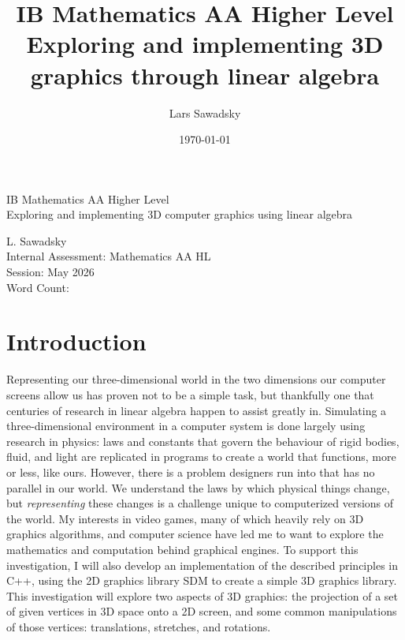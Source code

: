 \documentclass[12pt, a4paper]{article}
\title{ IB Mathematics AA Higher Level\\
    
    Exploring and implementing 3D graphics through linear
algebra }
\author{Lars Sawadsky}
\date{\today}
\begin{document}
    \begin{titlepage}
        \begin{center}
            \vspace*{9cm}

            IB Mathematics AA Higher Level\\
            \medskip
            Exploring and implementing 3D computer graphics
            using linear algebra

            \vspace{8cm}

            L. Sawadsky\\
            Internal Assessment: Mathematics AA HL\\
            Session: May 2026\\
            Word Count:
        \end{center}
        \newpage
    \end{titlepage}

    \tableofcontents
    \newpage

    \section{Introduction}

    Representing our three-dimensional world in the two
    dimensions our computer screens allow us has proven not to
    be a simple task, but thankfully one that centuries of
    research in linear algebra happen to assist greatly in.
    Simulating a three-dimensional environment in a computer
    system is done largely using research in physics: laws and
    constants that govern the behaviour of rigid bodies, fluid,
    and light are replicated in programs to create a world that
    functions, more or less, like ours. However, there is a
    problem designers run into that has no parallel in our
    world. We understand the laws by which physical things
    change, but \textit{representing} these changes is a
    challenge unique to computerized versions of the world. My
    interests in video games, many of which heavily rely on 3D
    graphics algorithms, and computer science have led me to
    want to explore the mathematics and computation behind
    graphical engines. To support this investigation, I will
    also develop an implementation of the described principles
    in C++, using the 2D graphics library SDM to create a simple
    3D graphics library. This investigation will explore two aspects
    of 3D graphics: the projection of a set of given
    vertices in 3D space onto a 2D screen, and some common
    manipulations of those vertices: translations, stretches,
    and rotations.
\end{document}
